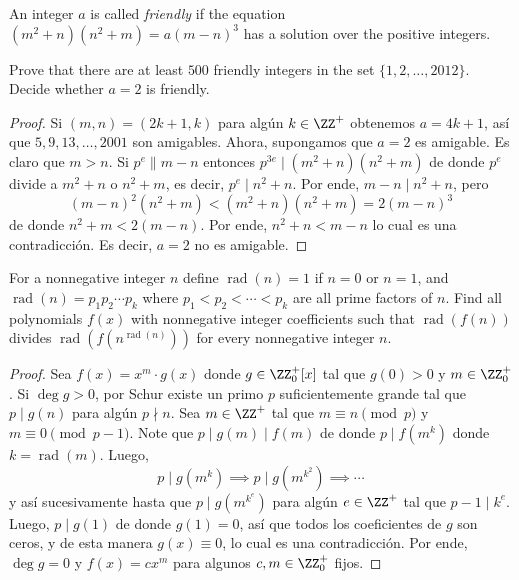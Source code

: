\begin{probEG}[ISL 2012/N4]
  An integer $a$ is called \emph{friendly} if the equation
  $(m^2+n)(n^2+m)=a(m-n)^3$ has a solution over the positive integers.
  \begin{enumerate}[(a)]
    \ii Prove that there are at least $500$ friendly integers in the set
    $\{1,2,\dots,2012\}$.
    \ii Decide whether $a=2$ is friendly.
  \end{enumerate}
\end{probEG}

\begin{proof}
  Si $(m,n)=(2k+1,k)$ para algún $k\in\ZZ^+$ obtenemos $a=4k+1$, así que
  $5,9,13,\dots,2001$ son amigables. Ahora, supongamos que $a=2$ es amigable. Es
  claro que $m>n$. Si $p^e\parallel m-n$ entonces $p^{3e}\mid(m^2+n)(n^2+m)$ de
  donde $p^e$ divide a $m^2+n$ o $n^2+m$, es decir, $p^e\mid n^2+n$. Por ende,
  $m-n\mid n^2+n$, pero
  \[(m-n)^2(n^2+m)<(m^2+n)(n^2+m)=2(m-n)^3\]
  de donde $n^2+m<2(m-n)$. Por ende, $n^2+n<m-n$ lo cual es una contradicción.
  Es decir, $a=2$ no es amigable.
\end{proof}

\begin{probEG}[ISL 2012/N5]
  For a nonnegative integer $n$ define $\operatorname{rad}(n)=1$ if $n=0$ or
  $n=1$, and $\operatorname{rad}(n)=p_1p_2\cdots p_k$ where $p_1<p_2<\cdots<p_k$
  are all prime factors of $n$. Find all polynomials $f(x)$ with nonnegative
  integer coefficients such that $\operatorname{rad}(f(n))$ divides
  $\operatorname{rad}(f(n^{\operatorname{rad}(n)}))$ for every nonnegative
  integer $n$.
\end{probEG}

\begin{proof}
  Sea $f(x)=x^m\cdot g(x)$ donde $g\in\ZZ^+_0[x]$ tal que $g(0)>0$ y
  $m\in\ZZ^+_0$. Si $\deg g>0$, por Schur existe un primo $p$ suficientemente
  grande tal que $p\mid g(n)$ para algún $p\nmid n$. Sea $m\in\ZZ^+$ tal que
  $m\equiv n\pmod p$ y $m\equiv 0\pmod{p-1}$. Note que $p\mid g(m)\mid f(m)$ de
  donde $p\mid f(m^k)$ donde $k=\operatorname{rad}(m)$. Luego,
  \[p\mid g(m^k)\implies p\mid g(m^{k^2})\implies\cdots\]
  y así sucesivamente hasta que $p\mid g(m^{k^e})$ para algún $e\in\ZZ^+$ tal
  que $p-1\mid k^e$. Luego, $p\mid g(1)$ de donde $g(1)=0$, así que todos los
  coeficientes de $g$ son ceros, y de esta manera $g(x)\equiv 0$, lo cual es una
  contradicción. Por ende, $\deg g=0$ y $f(x)=cx^m$ para algunos $c,m\in\ZZ^+_0$
  fijos.
\end{proof}

